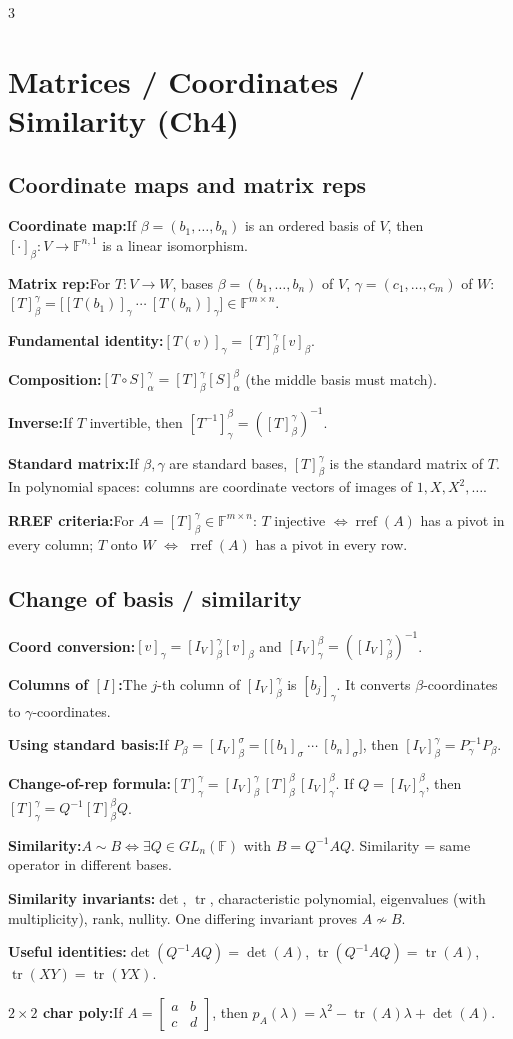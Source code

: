 \documentclass[10pt]{article}
\newcommand{\F}{\mathbb{F}}
\newcommand{\tr}{\operatorname{tr}}
\newenvironment{cheatitems}{\par\vspace{-1pt}}{\par\vspace{-1pt}}
\newcommand{\cheatrow}[2]{%
  \par\noindent\textbf{#1:}\nobreak\enspace #2\par
}
\begin{document}
\begin{multicols}{3}
\section*{Matrices / Coordinates / Similarity (Ch4)}

\subsection*{Coordinate maps and matrix reps}
\begin{cheatitems}
\cheatrow{Coordinate map}{If $\beta=(b_1,\dots,b_n)$ is an ordered basis of $V$, then $[\cdot]_\beta:V\to\F^{n,1}$ is a linear isomorphism.}
\cheatrow{Matrix rep}{For $T:V\to W$, bases $\beta=(b_1,\dots,b_n)$ of $V$, $\gamma=(c_1,\dots,c_m)$ of $W$: $[T]^\gamma_\beta=\bigl[[T(b_1)]_\gamma\ \cdots\ [T(b_n)]_\gamma\bigr]\in\F^{m\times n}$.}
\cheatrow{Fundamental identity}{$[T(v)]_\gamma=[T]^\gamma_\beta[v]_\beta$.}
\cheatrow{Composition}{$[T\circ S]^\gamma_\alpha=[T]^\gamma_\beta[S]^\beta_\alpha$ (the middle basis must match).}
\cheatrow{Inverse}{If $T$ invertible, then $[T^{-1}]^\beta_\gamma=([T]^\gamma_\beta)^{-1}$.}
\cheatrow{Standard matrix}{If $\beta,\gamma$ are standard bases, $[T]^\gamma_\beta$ is the standard matrix of $T$. In polynomial spaces: columns are coordinate vectors of images of $1,X,X^2,\dots$.}
\cheatrow{RREF criteria}{For $A=[T]^\gamma_\beta\in\F^{m\times n}$: $T$ injective $\iff \operatorname{rref}(A)$ has a pivot in every column; $T$ onto $W$ $\iff$ $\operatorname{rref}(A)$ has a pivot in every row.}
\end{cheatitems}

\subsection*{Change of basis / similarity}
\begin{cheatitems}
\cheatrow{Coord conversion}{$[v]_\gamma=[I_V]^\gamma_\beta[v]_\beta$ and $[I_V]^\beta_\gamma=([I_V]^\gamma_\beta)^{-1}$.}
\cheatrow{Columns of $[I]$}{The $j$-th column of $[I_V]^\gamma_\beta$ is $[b_j]_\gamma$. It converts $\beta$-coordinates to $\gamma$-coordinates.}
\cheatrow{Using standard basis}{If $P_\beta=[I_V]^\sigma_\beta=\bigl[[b_1]_\sigma\ \cdots\ [b_n]_\sigma\bigr]$, then $[I_V]^\gamma_\beta=P_\gamma^{-1}P_\beta$.}
\cheatrow{Change-of-rep formula}{$[T]^\gamma_\gamma=[I_V]^\gamma_\beta\,[T]^\beta_\beta\,[I_V]^\beta_\gamma$. If $Q=[I_V]^\beta_\gamma$, then $[T]^\gamma_\gamma=Q^{-1}[T]^\beta_\beta Q$.}
\cheatrow{Similarity}{$A\sim B \iff \exists Q\in GL_n(\F)$ with $B=Q^{-1}AQ$. Similarity = same operator in different bases.}
\cheatrow{Similarity invariants}{$\det$, $\tr$, characteristic polynomial, eigenvalues (with multiplicity), rank, nullity. One differing invariant proves $A\not\sim B$.}
\cheatrow{Useful identities}{$\det(Q^{-1}AQ)=\det(A)$, $\tr(Q^{-1}AQ)=\tr(A)$, $\tr(XY)=\tr(YX)$.}
\cheatrow{$2\times2$ char poly}{If $A=\begin{bmatrix}a&b\\ c&d\end{bmatrix}$, then $p_A(\lambda)=\lambda^2-\tr(A)\lambda+\det(A)$.}
\end{cheatitems}


\end{multicols}
\end{document}
